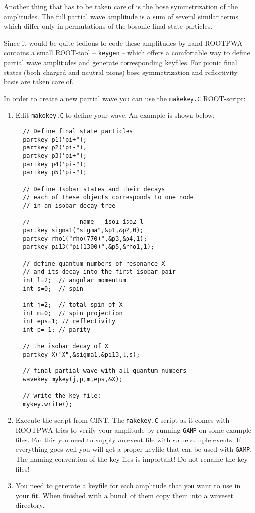 \documentclass[12pt,a4paper]{article}
\begin{document}
{Another thing that has to be taken care of is the bose symmetrization of the amplitudes. The full partial wave amplitude is a sum of several similar terms which differ only in permutations of the bosonic final state particles.

Since it would be quite tedious to code these amplitudes by hand ROOTPWA contains a small ROOT-tool -- {\tt keygen} -- which offers a comfortable way to define partial wave amplitudes and generate corresponding keyfiles. For pionic final states (both charged and neutral pions) bose symmetrization and reflectivity basis are taken care of.

In order to create a new partial wave you can use the {\tt makekey.C} ROOT-script:
\begin{enumerate}
\item Edit {\tt makekey.C} to define your wave. An example is shown below:
\begin{lstlisting}
  // Define final state particles
  partkey p1("pi+");
  partkey p2("pi-");
  partkey p3("pi+");
  partkey p4("pi-");
  partkey p5("pi-");

  // Define Isobar states and their decays
  // each of these objects corresponds to one node
  // in an isobar decay tree
  
  //              name   iso1 iso2 l
  partkey sigma1("sigma",&p1,&p2,0);
  partkey rho1("rho(770)",&p3,&p4,1);
  partkey pi13("pi(1300)",&p5,&rho1,1);

  // define quantum numbers of resonance X 
  // and its decay into the first isobar pair
  int l=2;  // angular momentum 
  int s=0;  // spin

  int j=2;  // total spin of X
  int m=0;  // spin projection
  int eps=1; // reflectivity
  int p=-1; // parity

  // the isobar decay of X
  partkey X("X",&sigma1,&pi13,l,s);

  // final partial wave with all quantum numbers
  wavekey mykey(j,p,m,eps,&X);

  // write the key-file:
  mykey.write();
\end{lstlisting}

\item Execute the script from CINT. The {\tt makekey.C} script as it comes with ROOTPWA tries to verify your amplitude by running {\tt GAMP} on some example files. For this you need to supply an event file with some sample events. If everything goes well you will get a proper keyfile that can be used with {\tt GAMP}. The naming convention of the key-files is important! Do not rename the key-files!
\item You need to generate a keyfile for each amplitude that you want to use in your fit. When finished with a bunch of them copy them into a waveset directory. \end{enumerate}

}
\end{document}
